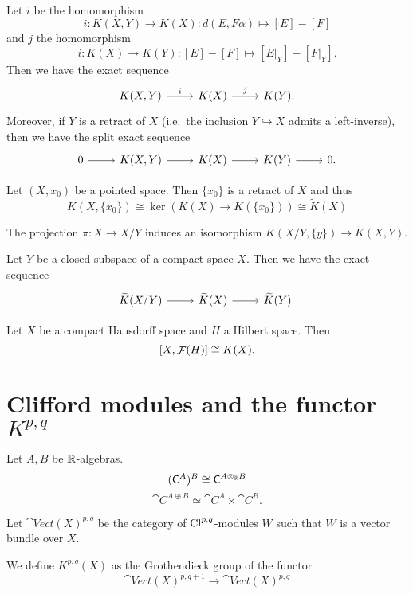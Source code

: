 \begin{proposition}
Let $i$ be the homomorphism
\[ i:K(X,Y)\to K(X): d(E,F\alpha) \mapsto [E]-[F] \]
and $j$ the homomorphism
\[ i:K(X)\to K(Y): [E]-[F] \mapsto [E|_Y]-[F|_Y]. \]
Then we have the exact sequence
\[ \begin{tikzcd}
K(X,Y) \rar{i} & K(X) \rar{j} & K(Y).
\end{tikzcd} \]
Moreover, if $Y$ is a retract of $X$ (i.e.\ the inclusion $Y\hookrightarrow X$ admits a left-inverse), then we have the split exact sequence
\[ \begin{tikzcd}
0 \rar & K(X,Y) \rar & K(X) \rar & K(Y) \rar & 0.
\end{tikzcd} \]
\end{proposition}
\begin{corollary}
Let $(X,x_0)$ be a pointed space. Then $\{x_0\}$ is a retract of $X$ and thus
\[ K(X, \{x_0\}) \cong \ker(K(X)\to K(\{x_0\})) \cong \widetilde{K}(X) \]
\end{corollary}

\begin{proposition}
The projection $\pi: X\to X/Y$ induces an isomorphism $K(X/Y,\{y\}) \to K(X,Y)$.
\end{proposition}

\begin{proposition}
Let $Y$ be a closed subspace of a compact space $X$. Then we have the 
exact sequence 
\[ \begin{tikzcd}
\widetilde{K}(X/Y) \rar & \widetilde{K}(X) \rar & \widetilde{K}(Y).
\end{tikzcd} \]
\end{proposition}

\begin{theorem}
Let $X$ be a compact Hausdorff space and $H$ a Hilbert space. Then
\[ [X,\mathop{\mathcal{F}}(H)] \cong K(X). \]
\end{theorem}

\section{Clifford modules and the functor $K^{p,q}$}
\begin{proposition}
Let $A,B$ be $\mathbb{R}$-algebras. 
\[ (\mathsf{C}^A)^B \cong \mathsf{C}^{A\otimes_{\mathbb{R}} B} \]
\[ \cat{C}^{A\oplus B}\simeq \cat{C}^A\times \cat{C}^B. \]
\end{proposition}

\begin{definition}
Let $\cat{Vect}(X)^{p,q}$ be the category of $\operatorname{Cl}^{p,q}$-modules $W$ such that $W$ is a vector bundle over $X$.

We define $K^{p,q}(X)$ as the Grothendieck group of the functor
\[ \cat{Vect}(X)^{p,q+1}\to \cat{Vect}(X)^{p,q}  \]
\end{definition}

